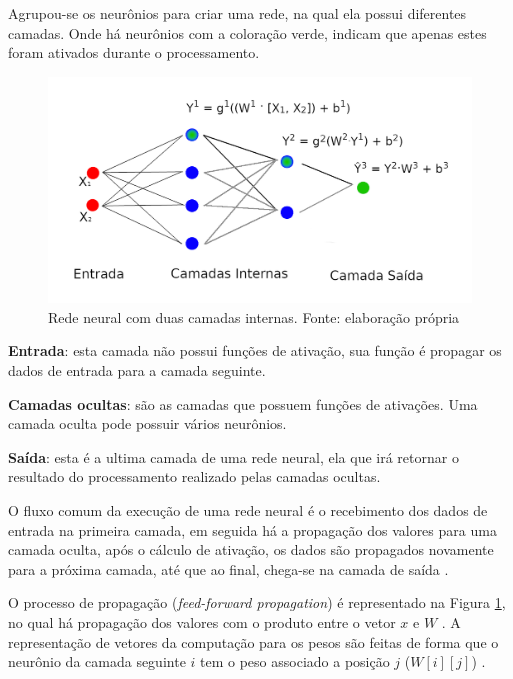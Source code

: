 Agrupou-se os neurônios para criar uma rede, na qual ela possui diferentes camadas. Onde há neurônios com a coloração verde, indicam que apenas estes foram ativados durante o processamento.

\begin{figure}[h]
	\centering
    \includegraphics[keepaspectratio=true,scale=1.3]{figuras/redeNeural}
	\caption[Rede Neural Simples]{Rede neural com duas camadas internas. Fonte: elaboração própria}
	\label{fig:redeNeural}
\end{figure}

\begin{description}
	\item \textbf{Entrada}: esta camada não possui funções de ativação, sua função é propagar os dados de entrada para a camada seguinte.
    \item \textbf{Camadas ocultas}: são as camadas que possuem funções de ativações. Uma camada oculta pode possuir vários neurônios.
    \item \textbf{Saída}: esta é a ultima camada de uma rede neural, ela que irá retornar o resultado do processamento realizado pelas camadas ocultas.
\end{description}

O fluxo comum da execução de uma rede neural é o recebimento dos dados de entrada na primeira camada, em seguida há a propagação dos valores para uma camada oculta, após o cálculo de ativação, os dados são propagados novamente para a próxima camada, até que ao final, chega-se na camada de saída \cite{GOLDBERG2017}.

O processo de propagação (\textit{feed-forward propagation}) é representado na Figura \ref{fig:redeNeural}, no qual há propagação dos valores com o produto entre o vetor $x$ e $W$ \cite{GOLDBERG2017}. A representação de vetores da computação para os pesos são feitas de forma que o neurônio da camada seguinte $i$ tem o peso associado a posição $j$ ($W[i][j]$) \cite{NIELSEN2015}.

